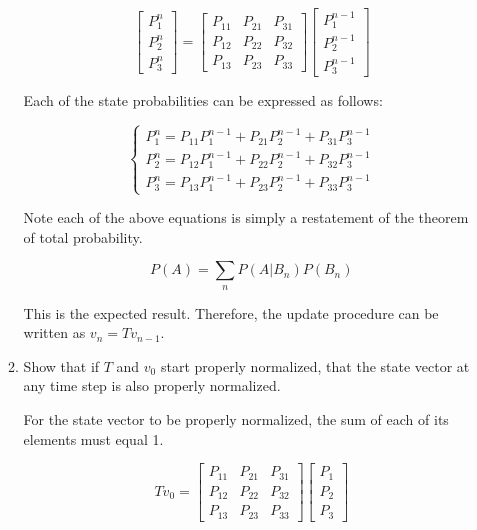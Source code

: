 \documentclass[fleqn]{article}
\begin{document}
\begin{enumerate}[nolistsep]
\begin{enumerate}
			\begin{equation*}
				\begin{bmatrix}
					P_{1}^{n} \\
					P_{2}^{n} \\
					P_{3}^{n}
				\end{bmatrix} = \begin{bmatrix}
					P_{11} & P_{21} & P_{31} \\
					P_{12} & P_{22} & P_{32} \\
					P_{13} & P_{23} & P_{33}
				\end{bmatrix}\begin{bmatrix}
					P_{1}^{n-1} \\
					P_{2}^{n-1} \\
					P_{3}^{n-1}
				\end{bmatrix}
			\end{equation*}
			
			Each of the state probabilities can be expressed as follows:
			
			\begin{equation*}
				\begin{cases}
					P_{1}^{n} = P_{11}P_{1}^{n-1} + P_{21}P_{2}^{n-1} + P_{31}P_{3}^{n-1} \\
					P_{2}^{n} = P_{12}P_{1}^{n-1} + P_{22}P_{2}^{n-1} + P_{32}P_{3}^{n-1} \\
					P_{3}^{n} = P_{13}P_{1}^{n-1} + P_{23}P_{2}^{n-1} + P_{33}P_{3}^{n-1}
				\end{cases}
			\end{equation*}
			
			Note each of the above equations is simply a restatement of the theorem of total probability.
			
			\begin{equation*}
				P(A) = \sum_{n}{P(A|B_n)P(B_n)}
			\end{equation*}
			
			This is the expected result. Therefore, the update procedure can be written as $v_n = Tv_{n-1}$.
			
			\item Show that if $T$ and $v_0$ start properly normalized, that the state vector at any time step is also properly normalized.
			
			For the state vector to be properly normalized, the sum of each of its elements must equal 1.
			
			\begin{equation*}
				Tv_0 = \begin{bmatrix}
					P_{11} & P_{21} & P_{31} \\
					P_{12} & P_{22} & P_{32} \\
					P_{13} & P_{23} & P_{33}
				\end{bmatrix}\begin{bmatrix}
					P_1 \\
					P_2 \\
					P_3
				\end{bmatrix}
			\end{equation*}
			

\end{enumerate}
\end{enumerate}
\end{document}
